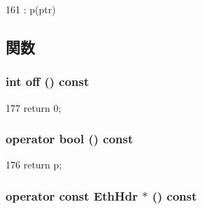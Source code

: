 \begin{DoxyCode}
161 : p(ptr) { }
\end{DoxyCode}


\subsection{関数}
\hypertarget{classNet_1_1EthPtr_a81fa7ab0c6e92d4496ee915a8a3705f9}{
\subsubsection[{off}]{\setlength{\rightskip}{0pt plus 5cm}int off () const}}
\label{classNet_1_1EthPtr_a81fa7ab0c6e92d4496ee915a8a3705f9}



\begin{DoxyCode}
177 { return 0; }
\end{DoxyCode}
\hypertarget{classNet_1_1EthPtr_aa385aa18f5e42db5a415c25a90f4193d}{
\subsubsection[{operator bool}]{\setlength{\rightskip}{0pt plus 5cm}operator bool () const}}
\label{classNet_1_1EthPtr_aa385aa18f5e42db5a415c25a90f4193d}



\begin{DoxyCode}
176 { return p; }
\end{DoxyCode}
\hypertarget{classNet_1_1EthPtr_afad950f77e0684c02410878904f3c723}{
\subsubsection[{operator const EthHdr $\ast$}]{\setlength{\rightskip}{0pt plus 5cm}operator const {\bf EthHdr} $\ast$ () const}}
\label{classNet_1_1EthPtr_afad950f77e0684c02410878904f3c723}



